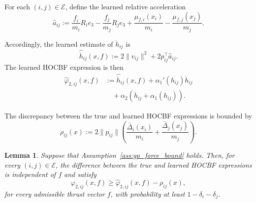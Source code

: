 \documentclass[journal,twoside,web]{ieeecolor}
\newtheorem{lemma}[theorem]{Lemma}
\begin{document}
For each $(i,j)\in\mathcal E$, define the learned relative
acceleration
\begin{equation}
    \widehat a_{ij}
    :=
    \frac{f_i}{m_i}R_ie_3
    -
    \frac{f_j}{m_j}R_je_3
    +
    \frac{\mu_{f,i}(x_i)}{m_i}
    -
    \frac{\mu_{f,j}(x_j)}{m_j}.
    \label{eq:learned_relative_acceleration}
\end{equation}

Accordingly, the learned estimate of $\ddot h_{ij}$ is
\begin{equation}
    \widehat{\ddot h}_{ij}(x,f)
    :=
    2\|v_{ij}\|^2
    +
    2p_{ij}^{\top}\widehat a_{ij}.
    \label{eq:learned_hddot}
\end{equation}
The learned HOCBF expression is then
\begin{equation}
\begin{aligned}
    \widehat\varphi_{2,ij}(x,f)
    &:=
    \widehat{\ddot h}_{ij}(x,f)
    +
    \alpha_1'(h_{ij})\dot h_{ij} \\
    &\quad+
    \alpha_2\!\left(
        \dot h_{ij}+\alpha_1(h_{ij})
    \right).
\end{aligned}
\label{eq:learned_hocbf}
\end{equation}

The discrepancy between the true and learned HOCBF
expressions is bounded by
\begin{equation}
    \rho_{ij}(x)
    :=
    2\|p_{ij}\|
    \left(
        \frac{\bar\Delta_i(x_i)}{m_i}
        +
        \frac{\bar\Delta_j(x_j)}{m_j}
    \right).
    \label{eq:robustness_bound}
\end{equation}

\begin{lemma}\label{lem:robust_hocbf_deviation} 
Suppose that Assumption~\ref{ass:gp_force_bound} holds. Then, for
every $(i,j)\in\mathcal E$, the difference between the true and learned HOCBF expressions is independent of $f$ and satisfy
\begin{equation}
    \varphi_{2,ij}(x,f)
    \geq
    \widehat\varphi_{2,ij}(x,f)
    -
    \rho_{ij}(x),
    \label{eq:robust_hocbf_bound}
\end{equation}
for every admissible thrust vector $f$, with probability at least $1-\delta_i-\delta_j$.
\end{lemma}
\end{document}
